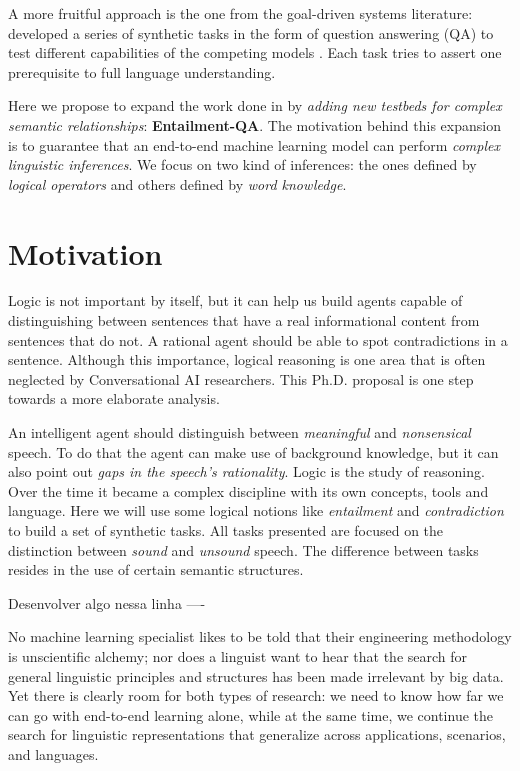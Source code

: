 A more fruitful approach is the one from the goal-driven systems literature: developed a series of synthetic tasks in the form of question answering (QA) to test different capabilities of the competing models \cite{BordesW16, Hixon15, WestonBCM15}. Each task tries to assert one prerequisite to full language understanding.

Here we propose to expand the work done in \cite{BordesW16, WestonBCM15} by \textit{adding new testbeds for complex semantic relationships}: \textbf{Entailment-QA}. The motivation behind this expansion is to guarantee that an end-to-end machine learning model can perform \textit{complex linguistic inferences}. We focus on two kind of inferences: the ones defined by \textit{logical operators} and others defined by \textit{word knowledge}.


\section{Motivation}
\label{sec:motivation}

Logic is not important by itself, but it can help us build agents capable of distinguishing between sentences that have a real informational content from sentences that do not. A rational agent should be able to spot contradictions in a sentence. Although this importance, logical reasoning is one area that is often neglected by Conversational AI researchers. This Ph.D. proposal is one step towards a more elaborate analysis.

An intelligent agent should distinguish between \textit{meaningful} and \textit{nonsensical} speech. To do that the agent can make use of background knowledge, but it can also point out \textit{gaps in the speech's rationality}. Logic is the study of reasoning. Over the time it became a complex discipline with its own concepts, tools and language. Here we will use some logical notions like \textit{entailment} and \textit{contradiction} to build a set of synthetic tasks. All tasks presented are focused on the distinction between \textit{sound} and \textit{unsound} speech. The difference between tasks resides in the use of certain semantic structures.

Desenvolver algo nessa linha ----

No machine learning specialist likes to be told that their engineering methodology is unscientific alchemy; nor does a linguist want to hear that the search for general linguistic principles and structures has been made irrelevant by big data. Yet there is clearly room for both types of research: we need to know how far we can go with end-to-end learning alone, while at the same time, we continue the search for
linguistic representations that generalize across applications, scenarios, and languages.

